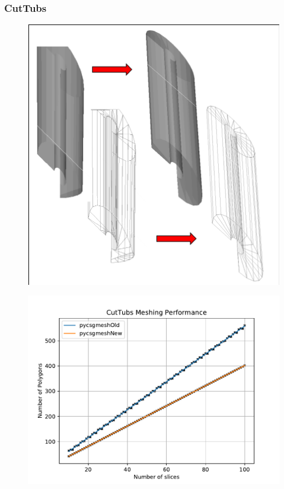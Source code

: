 \documentclass[12pt,a4paper]{article}
\begin{document}
\subsubsection{CutTubs}

\begin{figure}[h!]
\centering
\begin{minipage}{.2\textwidth}
  \centering
  \includegraphics[height=1\linewidth]{Images//Meshes//CutTubs.png}
  \label{ctub}
\end{minipage}%
\begin{minipage}{.3\textwidth}
  \centering
  \includegraphics[scale=0.35]{Images//Quad_fits//CutTubs_quad.pdf}
  \label{}
\end{minipage}%
\end{figure}
\end{document}
